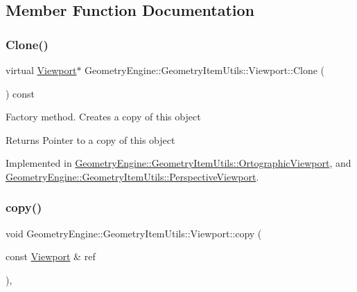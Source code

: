 \subsection{Member Function Documentation}
\mbox{\label{class_geometry_engine_1_1_geometry_item_utils_1_1_viewport_a8bd47866a001eae03f88df67fd699904}} 
\subsubsection{\texorpdfstring{Clone()}{Clone()}}
{\footnotesize\ttfamily virtual \mbox{\hyperlink{class_geometry_engine_1_1_geometry_item_utils_1_1_viewport}{Viewport}}$\ast$ Geometry\+Engine\+::\+Geometry\+Item\+Utils\+::\+Viewport\+::\+Clone (\begin{DoxyParamCaption}{ }\end{DoxyParamCaption}) const\hspace{0.3cm}{\ttfamily [pure virtual]}}

Factory method. Creates a copy of this object \begin{DoxyReturn}{Returns}
Pointer to a copy of this object 
\end{DoxyReturn}


Implemented in \mbox{\hyperlink{class_geometry_engine_1_1_geometry_item_utils_1_1_ortographic_viewport_a7729f7619d67c139f8510c305de1a286}{Geometry\+Engine\+::\+Geometry\+Item\+Utils\+::\+Ortographic\+Viewport}}, and \mbox{\hyperlink{class_geometry_engine_1_1_geometry_item_utils_1_1_perspective_viewport_a828a22e5d39e7c8d1812e97f582bf667}{Geometry\+Engine\+::\+Geometry\+Item\+Utils\+::\+Perspective\+Viewport}}.

\mbox{\label{class_geometry_engine_1_1_geometry_item_utils_1_1_viewport_a2cd0eeeac769d5da977a17a4e394a1d9}} 
\subsubsection{\texorpdfstring{copy()}{copy()}}
{\footnotesize\ttfamily void Geometry\+Engine\+::\+Geometry\+Item\+Utils\+::\+Viewport\+::copy (\begin{DoxyParamCaption}\item[{const \mbox{\hyperlink{class_geometry_engine_1_1_geometry_item_utils_1_1_viewport}{Viewport}} \&}]{ref }\end{DoxyParamCaption})\hspace{0.3cm}{\ttfamily [protected]}, {\ttfamily [virtual]}}

